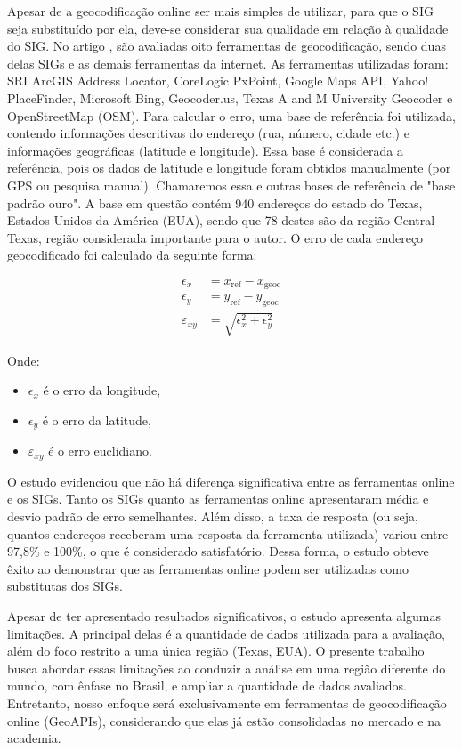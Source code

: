 Apesar de a geocodificação online ser mais simples de utilizar, para que o SIG seja substituído por ela, deve-se considerar sua qualidade em relação à qualidade do SIG. No artigo \cite{Chow2016}, são avaliadas oito ferramentas de geocodificação, sendo duas delas SIGs e as demais ferramentas da internet. As ferramentas utilizadas foram: SRI ArcGIS Address Locator, CoreLogic PxPoint, Google Maps API, Yahoo! PlaceFinder, Microsoft Bing, Geocoder.us, Texas A and M University Geocoder e OpenStreetMap (OSM). Para calcular o erro, uma base de referência foi utilizada, contendo informações descritivas do endereço (rua, número, cidade etc.) e informações geográficas (latitude e longitude). Essa base é considerada a referência, pois os dados de latitude e longitude foram obtidos manualmente (por GPS ou pesquisa manual). Chamaremos essa e outras bases de referência de "base padrão ouro". A base em questão contém 940 endereços do estado do Texas, Estados Unidos da América (EUA), sendo que 78 destes são da região Central Texas, região considerada importante para o autor. O erro de cada endereço geocodificado foi calculado da seguinte forma:

\begin{align}
   \epsilon_x &= x_{\text{ref}} - x_{\text{geoc}} \\
   \epsilon_y &= y_{\text{ref}} - y_{\text{geoc}} \\
   \varepsilon_{xy} &= \sqrt{\epsilon_x^2 + \epsilon_y^2}
\end{align}

Onde:
\begin{itemize}
   \item $\epsilon_x$ é o erro da longitude,
   \item $\epsilon_y$ é o erro da latitude,
   \item $\varepsilon_{xy}$ é o erro euclidiano.
\end{itemize}
   
O estudo evidenciou que não há diferença significativa entre as ferramentas online e os SIGs. Tanto os SIGs quanto as ferramentas online apresentaram média e desvio padrão de erro semelhantes. Além disso, a taxa de resposta (ou seja, quantos endereços receberam uma resposta da ferramenta utilizada) variou entre 97,8\% e 100\%, o que é considerado satisfatório. Dessa forma, o estudo obteve êxito ao demonstrar que as ferramentas online podem ser utilizadas como substitutas dos SIGs.

Apesar de \cite{Chow2016} ter apresentado resultados significativos, o estudo apresenta algumas limitações. A principal delas é a quantidade de dados utilizada para a avaliação, além do foco restrito a uma única região (Texas, EUA). O presente trabalho busca abordar essas limitações ao conduzir a análise em uma região diferente do mundo, com ênfase no Brasil, e ampliar a quantidade de dados avaliados. Entretanto, nosso enfoque será exclusivamente em ferramentas de geocodificação online (GeoAPIs), considerando que elas já estão consolidadas no mercado e na academia.

